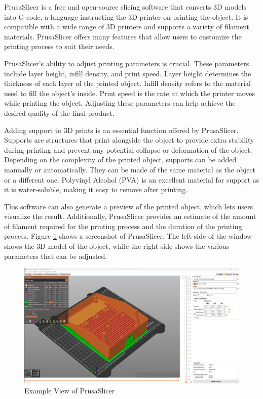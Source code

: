 PrusaSlicer \cite{PrusaSlicer} is a free and open-source slicing software that converts 3D models into G-code, a language instructing the 3D printer on printing the object. It is compatible with a wide range of 3D printers and supports a variety of filament materials. PrusaSlicer offers many features that allow users to customize the printing process to suit their needs.

PrusaSlicer's ability to adjust printing parameters is crucial. These parameters include layer height, infill density, and print speed. Layer height determines the thickness of each layer of the printed object. Infill density refers to the material used to fill the object's inside. Print speed is the rate at which the printer moves while printing the object. Adjusting these parameters can help achieve the desired quality of the final product.

Adding support to 3D prints is an essential function offered by PrusaSlicer. Supports are structures that print alongside the object to provide extra stability during printing and prevent any potential collapse or deformation of the object. Depending on the complexity of the printed object, supports can be added manually or automatically. They can be made of the same material as the object or a different one. Polyvinyl Alcohol (PVA) is an excellent material for support as it is water-soluble, making it easy to remove after printing.

This software can also generate a preview of the printed object, which lets users visualize the result. Additionally, PrusaSlicer provides an estimate of the amount of filament required for the printing process and the duration of the printing process. Figure \ref{fig:prusa_slicer} shows a screenshot of PrusaSlicer. The left side of the window shows the 3D model of the object, while the right side shows the various parameters that can be adjusted.

\begin{figure}
    \centering
    \includegraphics[width=0.8\linewidth]{texs/Part1/chapter1/image/prusaslicer.png}
    \caption{Example View of PrusaSlicer}
    \label{fig:prusa_slicer}
\end{figure}


